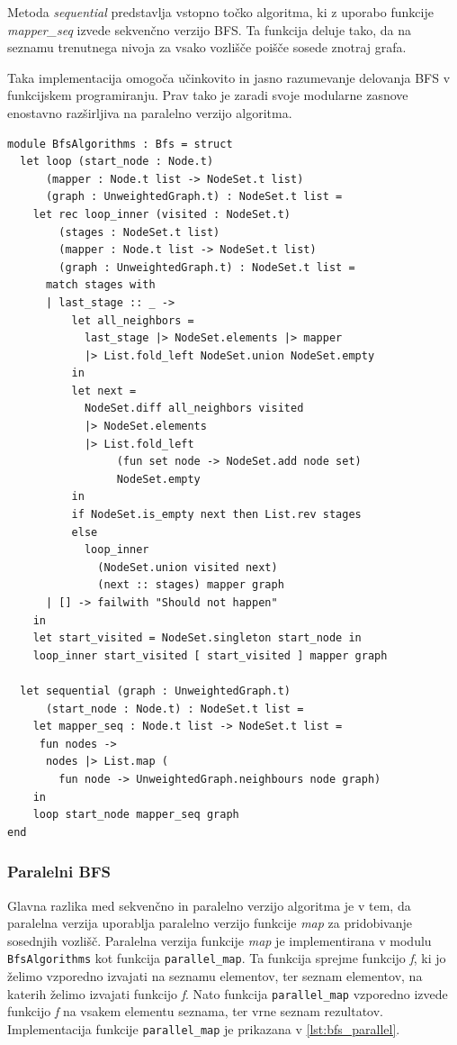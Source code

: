 \documentclass[mat1, tisk]{fmfdelo}
\begin{document}
Metoda \textit{sequential} predstavlja vstopno točko algoritma, ki z uporabo funkcije \textit{mapper\_seq} izvede
sekvenčno verzijo BFS. Ta funkcija deluje tako, da na seznamu trenutnega nivoja za vsako vozlišče poišče sosede znotraj grafa.

Taka implementacija omogoča učinkovito in jasno razumevanje delovanja BFS v funkcijskem programiranju. Prav tako je zaradi
svoje modularne zasnove enostavno razširljiva na paralelno verzijo algoritma.

\begin{lstlisting}[label=lst:bfs_sequential]
module BfsAlgorithms : Bfs = struct
  let loop (start_node : Node.t) 
      (mapper : Node.t list -> NodeSet.t list)
      (graph : UnweightedGraph.t) : NodeSet.t list =
    let rec loop_inner (visited : NodeSet.t) 
        (stages : NodeSet.t list)
        (mapper : Node.t list -> NodeSet.t list) 
        (graph : UnweightedGraph.t) : NodeSet.t list =
      match stages with
      | last_stage :: _ ->
          let all_neighbors =
            last_stage |> NodeSet.elements |> mapper
            |> List.fold_left NodeSet.union NodeSet.empty
          in
          let next =
            NodeSet.diff all_neighbors visited
            |> NodeSet.elements
            |> List.fold_left
                 (fun set node -> NodeSet.add node set)
                 NodeSet.empty
          in
          if NodeSet.is_empty next then List.rev stages
          else
            loop_inner
              (NodeSet.union visited next)
              (next :: stages) mapper graph
      | [] -> failwith "Should not happen"
    in
    let start_visited = NodeSet.singleton start_node in
    loop_inner start_visited [ start_visited ] mapper graph

  let sequential (graph : UnweightedGraph.t) 
      (start_node : Node.t) : NodeSet.t list =
    let mapper_seq : Node.t list -> NodeSet.t list =
     fun nodes ->
      nodes |> List.map (
        fun node -> UnweightedGraph.neighbours node graph)
    in
    loop start_node mapper_seq graph
end
\end{lstlisting}

\subsubsection{Paralelni BFS}

Glavna razlika med sekvenčno in paralelno verzijo algoritma je v tem, da paralelna verzija uporablja paralelno verzijo
funkcije \textit{map} za pridobivanje sosednjih vozlišč. Paralelna verzija funkcije \textit{map} je implementirana
v modulu \texttt{BfsAlgorithms} kot funkcija \texttt{parallel\_map}. Ta funkcija sprejme funkcijo \textit{f}, ki jo
želimo vzporedno izvajati na seznamu elementov, ter seznam elementov, na katerih želimo izvajati funkcijo \textit{f}.
Nato funkcija \texttt{parallel\_map} vzporedno izvede funkcijo \textit{f} na vsakem elementu seznama, ter vrne seznam
rezultatov. Implementacija funkcije \texttt{parallel\_map} je prikazana v \ref{lst:bfs_parallel}.
\end{document}

